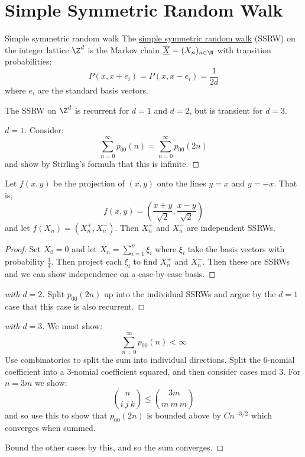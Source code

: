 \documentclass[../Main.tex]{subfiles}
\begin{document}
\section{Simple Symmetric Random Walk}
\begin{definition}{Simple symmetric random walk}
    The \underline{simple symmetric random walk} (SSRW) on the integer lattice $\Z^d$ is the Markov chain $\chain{X} = (X_n)_{n \in \N}$ with transition probabilities:
    \begin{equation*}
        P(x, x + e_i) = P(x, x-e_i) = \frac{1}{2d}
    \end{equation*}
    where $e_i$ are the standard basis vectors.
\end{definition}
\begin{theorem}
    The SSRW on $\Z^d$ is recurrent for $d = 1$ and $d = 2$, but is transient for $d = 3$.
    \label{thmSSRWRecurTrans}
\end{theorem}
\begin{proof}[$d = 1$]
    Consider:
    \begin{equation*}
        \sum_{n = 0}^{\infty} p_{00}(n) = \sum_{n=0}^{\infty} p_{00}(2n)
    \end{equation*}
    and show by Stirling's formula that this is infinite.
\end{proof}
\begin{lemma}
    Let $f(x, y)$ be the projection of $(x, y)$ onto the lines $y = x$ and $y = -x$. That is,
    \begin{equation*}
        f(x, y) = \left(\frac{x + y}{\sqrt{2}}, \frac{x - y}{\sqrt{2}}\right)
    \end{equation*}
    and let $f(X_n) = (X_n^+, X_n^-)$. Then $X_n^+$ and $X_n^-$ are independent SSRWs.
    \label{lemSSRWProject}
\end{lemma}
\begin{proof}
    Set $X_0 = 0$ and let $X_n = \sum_{i=1}^{n} \xi_i$ where $\xi_i$ take the basis vectors with probability $\frac14$. Then project each $\xi_i$ to find $X_n^+$ and $X_n^-$. Then these are SSRWs and we can show independence on a case-by-case basis.
\end{proof}
\begin{proof}[ with $d = 2$]
    Split $p_{00}(2n)$ up into the individual SSRWs and argue by the $d = 1$ case that this case is also recurrent.
\end{proof}
\begin{proof}[ with $d = 3$]
    We must show:
    \begin{equation*}
        \sum_{n=0}^{\infty} p_{00}(n) < \infty
    \end{equation*}
    Use combinatorics to split the sum into individual directions. Split the $6$-nomial coefficient into a $3$-nomial coefficient squared, and then consider cases mod 3. For $n = 3m$ we show:
    \begin{equation*}
        \binom{n}{i~j~k} \leq \binom{3m}{m~m~m}
    \end{equation*}
    and so use this to show that $p_{00}(2n)$ is bounded above by $Cn^{-3/2}$ which converges when summed.

    Bound the other cases by this, and so the sum converges.
\end{proof}
\end{document}
